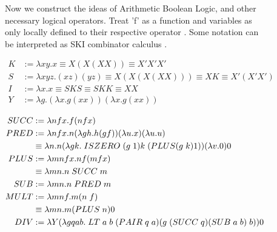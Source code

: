 \begin{figure}[htb]
Now we construct the ideas of Arithmetic Boolean Logic, and other necessary logical operators.
Treat 'f' as a function and variables as only locally defined to their respective operator \cite{LambdaFuncsList}.
Some notation can be interpreted as SKI combinator calculus \cite{SKICalcWiki}.

\[
    \begin{aligned}
        K &:= \lambda xy. x \equiv X(X (X X)) \equiv X' X' X'\\
        S &:= \lambda xyz. (x z) (y z) \equiv X (X (X (X X))) \equiv X K \equiv X' (X' X')\\
        I &:= \lambda x. x \equiv S K S \equiv S K K \equiv X X\\
        Y &:= \lambda g. (\lambda x. g (x x)) (\lambda x. g (x x))\\
    \end{aligned}
\]
\[
    \begin{aligned}
        SUCC &:= \lambda nfx. f (n f x)\\
        PRED &:= \lambda n fx. n (\lambda gh. h(g f)) (\lambda u. x) (\lambda u. u)\\
            &\equiv \lambda n. n (\lambda gk. \hspace{0.1cm} ISZERO \hspace{0.1cm} (g \hspace{0.1cm} 1) k \hspace{0.1cm} (PLUS (g \hspace{0.1cm}k) 1))  (\lambda v. 0) 0\\
        PLUS &:= \lambda mnfx. n f (m f x)\\
            &\equiv \lambda mn. n \hspace{0.1cm} SUCC \hspace{0.1cm} m\\
        SUB &:= \lambda mn. n \hspace{0.1cm} PRED \hspace{0.1cm} m\\
        MULT &:= \lambda mnf. m(n \hspace{0.1cm} f)\\
            &\equiv \lambda mn. m (PLUS \hspace{0.1cm} n) 0\\
        DIV &:= \lambda Y (\lambda gqab. \hspace{0.1cm} LT \hspace{0.1cm} a \hspace{0.1cm} b \hspace{0.1cm} (PAIR \hspace{0.1cm} q \hspace{0.1cm} a)(g \hspace{0.1cm} (SUCC \hspace{0.1cm} q) (SUB \hspace{0.1cm} a \hspace{0.1cm} b) \hspace{0.1cm} b)) 0\\

\end{aligned}\]
\end{figure}
